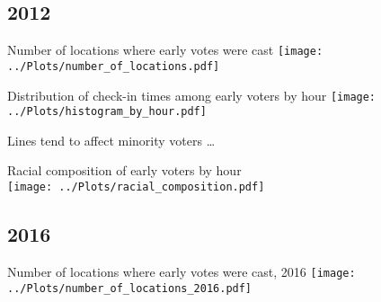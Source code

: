 \documentclass{beamer}
\begin{document}
		\subsection{2012}
		
		\begin{frame}				
		\end{frame}
		
		\begin{frame}
		 Number of locations where early votes were cast			
			\centering
			\texttt{[image: ../Plots/number\_of\_locations.pdf]}
		\end{frame}
	
		\begin{frame}	
		Distribution of check-in times among early voters by hour			
			\centering
			\texttt{[image: ../Plots/histogram\_by\_hour.pdf]}
		\end{frame}
		

		\begin{frame}				
		\centering Lines tend to affect minority voters \ldots
		\end{frame}

		\begin{frame}			
			\centering 
			Racial composition of early voters by hour	\\
			\texttt{[image: ../Plots/racial\_composition.pdf]}
		\end{frame}

%
%		
%		
		
		\subsection{2016}
		
		
		\begin{frame}				
			\centering 2016
		\end{frame}
		
		\begin{frame}				
		\centering 
		Number of locations where early votes were cast, 2016
		\texttt{[image: ../Plots/number\_of\_locations\_2016.pdf]}
		\end{frame}
		
\end{document}
